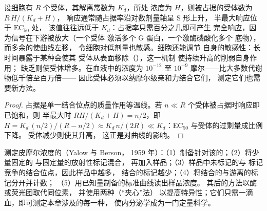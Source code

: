 \begin{proposition}[剂量与响应]\label{prop:b3:endocrinology:dose}
设细胞有 $R$ 个受体，其解离常数为 $K_{d}$，所处
浓度为 $H$，则被占据的受体数为 $R\,H/(K_{d} + H)$，
响应通常随占据率沿对数剂量轴呈 S 形上升，
半最大响应位于 $\text{EC}_{50}$ 处，
该值往往远低于 $K_{d}$：占据率只需百分之几即可产生
完全响应，因为信号在下游被放大（一个受体
激活多个 G 蛋白，一个激酶磷酸化多个
底物），而多余的\emph{}使曲线左移，
令细胞对低剂量也敏感。细胞还能调节
自身的敏感性：长时间暴露于某种会使其
受体从表面移除（\emph{}），这一机制
使持续升高的削弱自身作用；
缺乏则使受体增多。在血液中的浓度为 $10^{-12}$ 至
$10^{-9}$ 摩尔——比大多数代谢物低千倍至百万倍——
因此受体必须以纳摩尔级亲和力结合它们，
测定它们也需要新方法。
\end{proposition}
\begin{proof}
占据是单一结合位点的质量作用等温线。若
$n \ll R$ 个受体被占据时响应即已饱和，则
半最大时 $R H/(K_{d} + H) = n/2$，即 $H = K_{d}\,
(n/2)/(R - n/2) \approx K_{d}\, n/(2R) \ll K_{d}$：EC$_{50}$ 与受体的过剩量成比例下降。
受体减少则使其升高，
这正是对曲线的影响。
\end{proof}

\begin{method}[放射免疫分析]\label{met:b3:endocrinology:ria}
测定皮摩尔浓度的（Yalow 与 Berson，
1959 年）：（1）制备针对该的；（2）将少量固定的
与固定量的放射性标记混合，
再加入样品；（3）样品中未标记的与
标记竞争的结合位点，因此样品中越多，
结合的标记越少；（4）将结合的与游离的标记分开并计数；
（5）用已知量制备的标准曲线读出样品浓度。
其后的方法以酶或荧光团取代同位素，
并使用两种（“夹心”法）
以提高特异性；它们只需一滴血，即可测定本章涉及的每一种，
使内分泌学成为一门定量科学。
\end{method}

